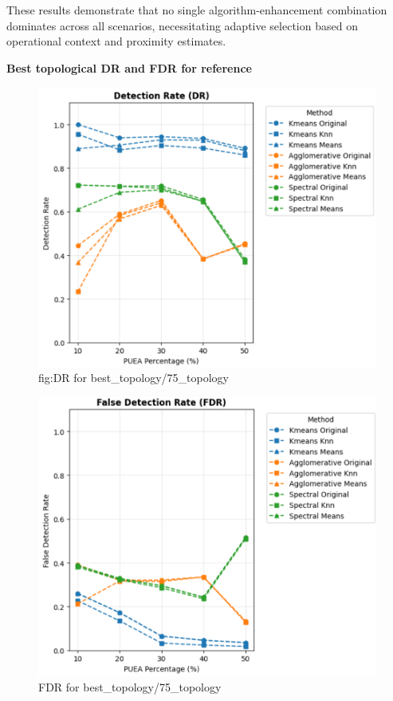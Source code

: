 \documentclass[pdflatex,sn-mathphys-num]{sn-jnl}%
\theoremstyle{thmstyleone}
\theoremstyle{thmstyletwo}
\theoremstyle{thmstylethree}
\begin{document}
These results demonstrate that no single algorithm-enhancement combination dominates across all scenarios, necessitating adaptive selection based on operational context and proximity estimates.

\textbf{Best topological DR and FDR for reference}
\begin{figure}
    \centering
    \includegraphics[width=0.8\linewidth]{figures/Results/best_topology/DR.png}
    \caption{fig:DR for best\_topology/75\_topology}
    \label{fig:DR for best topology/75 topology}
\end{figure}

\begin{figure}
    \centering
    \includegraphics[width=0.8\linewidth]{figures/Results/best_topology/FDR.png}
    \caption{FDR for best\_topology/75\_topology}
    \label{fig:FDR for best topology/75 topology}
    \label{fig:placeholder}
\end{figure}
\end{document}
